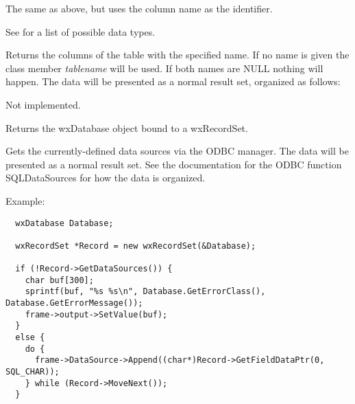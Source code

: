 The same as above, but uses the column name as the identifier.

See  for a list
of possible data types.



Returns the columns of the table with the specified name. If no name is
given the class member {\it tablename} will be used. If both names are NULL
nothing will happen. The data will be presented as a normal result set, organized
as follows:

\begin{twocollist}\itemsep=0pt
\end{twocollist}



Not implemented.



Returns the wxDatabase object bound to a wxRecordSet.

\label{wxrecordsetgetdatasources}


Gets the currently-defined data sources via the ODBC manager. The data will be presented
as a normal result set. See the documentation for the ODBC function SQLDataSources for how the data
is organized.

Example:
  
\begin{verbatim}
  wxDatabase Database;

  wxRecordSet *Record = new wxRecordSet(&Database);

  if (!Record->GetDataSources()) {
    char buf[300];
    sprintf(buf, "%s %s\n", Database.GetErrorClass(), Database.GetErrorMessage());
    frame->output->SetValue(buf);
  }
  else {
    do {
      frame->DataSource->Append((char*)Record->GetFieldDataPtr(0, SQL_CHAR));
    } while (Record->MoveNext());
  }
\end{verbatim}

